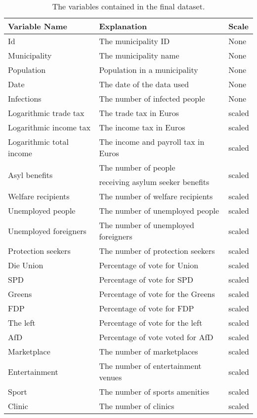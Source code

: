 \begin{table}[H] 
\caption{The variables contained in the final dataset.\label{finalGermany}}
\begin{tabular}{l l l}
\toprule
\textbf{Variable Name}	& \textbf{Explanation}	& \textbf{Scale}\\
\midrule
Id & The municipality ID & None\\
Municipality & The municipality name & None \\
Population & Population in a municipality & None \\
Date & The date of the data used & None\\
Infections & The number of infected people & None \\
Logarithmic trade tax & The trade tax in Euros & scaled \\
Logarithmic income tax & The income tax in Euros & scaled \\
Logarithmic total income & The income and payroll tax in Euros & scaled \\
\multirow{2}{*}{Asyl benefits} & The number of people & \multirow{2}{*}{scaled} \\
& receiving asylum seeker benefits \\
Welfare recipients & The number of welfare recipients & scaled \\
Unemployed people & The number of unemployed people & scaled \\
Unemployed foreigners & The number of unemployed foreigners & scaled \\
Protection seekers & The number of protection seekers & scaled \\
Die Union & Percentage of vote for Union & scaled\\
SPD & Percentage of vote for SPD & scaled\\
Greens & Percentage of vote for the Greens & scaled\\
FDP & Percentage of vote for FDP & scaled\\
The left & Percentage of vote for the left & scaled\\
AfD & Percentage of vote voted for AfD & scaled \\
Marketplace & The number of marketplaces & scaled \\
Entertainment & The number of entertainment venues & scaled \\
Sport & The number of sports amenities & scaled \\
Clinic & The number of clinics & scaled \\

\end{tabular}
\end{table}
